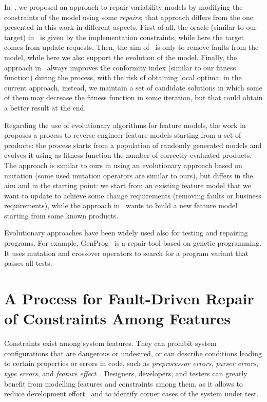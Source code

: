 \begin{tikzborder}{\cite{Gargantini16:validation}}
\begin{tikzborder}{\cite{gargantini_combinatorial_2017}}
\begin{tikzborder}{\cite{garn2019}}
\begin{tikzborder}{\cite{arcaini2019achieving}}
	In~\cite{repairVarModelsSPLC2017}, we proposed an approach to repair variability models by modifying the constraints of the model using some \emph{repairs}; that approach differs from the one presented in this work in different aspects. First of all, the oracle (similar to our target) in~\cite{repairVarModelsSPLC2017} is given by the implementation constraints, while here the target comes from update requests. Then, the aim of~\cite{repairVarModelsSPLC2017} is only to remove faults from the model, while here we also support the evolution of the model. Finally, the approach in~\cite{repairVarModelsSPLC2017} always improves the conformity index (similar to our fitness function) during the process, with the risk of obtaining local optima; in the current approach, instead, we maintain a set of candidate solutions in which some of them may decrease the fitness function in some iteration, but that could obtain a better result at the end.
	
	Regarding the use of evolutionary algorithms for feature models, the work in~\cite{LopezHerrejon2015353} proposes a process to reverse engineer feature models starting from a set of products: the process starts from a population of randomly generated models and evolves it using as fitness function the number of correctly evaluated products. The approach is similar to ours in using an evolutionary approach based on mutation (some used mutation operators are similar to ours), but differs in the aim and in the starting point: we start from an existing feature model that we want to update to achieve some change requirements (removing faults or business requirements), while the approach in~\cite{LopezHerrejon2015353} wants to build a new feature model starting from some known products.
	
	Evolutionary approaches have been widely used also for testing and repairing programs. For example, GenProg~\cite{le_goues_systematic_2012} is a repair tool based on genetic programming. It uses mutation and crossover operators to search for a program variant that passes all tests.
	\be
	
	\section{A Process for Fault-Driven Repair of Constraints Among Features}\label{sec:arcaini2019varivolution}
	
	Constraints exist among system features. They can prohibit system configurations that are dangerous or undesired, or can describe conditions leading to certain properties or errors in code, such as \textit{preprocessor errors}, \textit{parser errors}, \textit{type errors}, and \textit{feature effect}~\cite{NadiBKC14}. Designers, developers, and testers can greatly benefit from modelling features and constraints among them, as it allows to reduce development effort~\cite{Petke15:practical} and to identify corner cases of the system under test.
	

\end{tikzborder}
\end{tikzborder}
\end{tikzborder}
\end{tikzborder}
